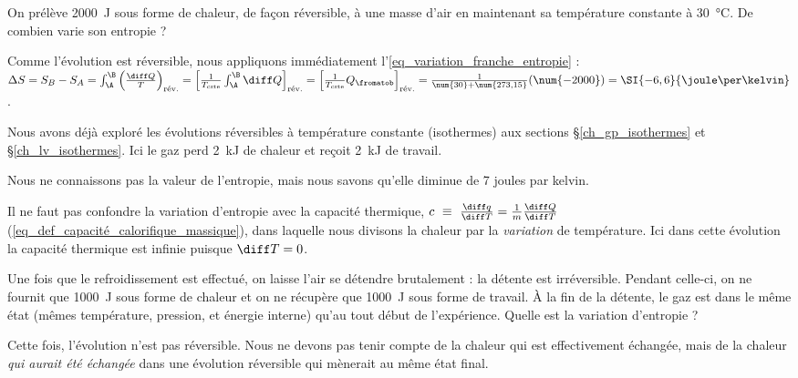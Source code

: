		\begin{anexample}
		\label{exemple_delta_entropie_basics}
			On prélève \SI{2000}{\joule} sous forme de chaleur, de façon réversible, à une masse d’air en maintenant sa température constante à \SI{30}{\degreeCelsius}. De combien varie son entropie ?
				\begin{answer}
					Comme l’évolution est réversible, nous appliquons immédiatement l’\cref{eq_variation_franche_entropie} : $\Delta S 
						= S_B - S_A
						= \int_\A^\B \left( \frac{\diff Q}{T} \right)_\text{rév.} 
						= \left[\frac{1}{T_\text{cste}} \int_\A^\B \diff Q \right]_\text{rév.}
						= \left[\frac{1}{T_\text{cste}} Q_\fromatob \right]_\text{rév.}
						= \frac{1}{\num{30} + \num{273,15}} (\num{-2000})
						= \SI{-6,6}{\joule\per\kelvin}$.
					\begin{remark}Nous avons déjà exploré les évolutions réversibles à température constante (isothermes) aux sections \S\ref{ch_gp_isothermes} et \S\ref{ch_lv_isothermes}. Ici le gaz perd \SI{2}{\kilo\joule} de chaleur et reçoit \SI{2}{\kilo\joule} de travail.\end{remark}
					\begin{remark}Nous ne connaissons pas la valeur de l’entropie, mais nous savons qu’elle diminue de 7 \si{joules} par \si{kelvin}.\end{remark}
					\begin{remark}Il ne faut pas confondre la variation d’entropie avec la capacité thermique, $c\ \equiv \ \frac{\diff q}{\diff T} = \frac{1}{m} \frac{\diff Q}{\diff T}$ (\ref{eq_def_capacité_calorifique_massique}), dans laquelle nous divisons la chaleur par la \emph{variation} de température. Ici dans cette évolution la capacité thermique est infinie puisque  $\diff T = 0$.\end{remark}
				\end{answer}
			
			Une fois que le refroidissement est effectué, on laisse l’air se détendre brutalement : la détente est irréversible. Pendant celle-ci, on ne fournit que \SI{1000}{\joule} sous forme de chaleur et on ne récupère que \SI{1000}{\joule} sous forme de travail. À la fin de la détente, le gaz est dans le même état (mêmes température, pression, et énergie interne) qu’au tout début de l’expérience. Quelle est la variation d’entropie ?
				\begin{answer} Cette fois, l’évolution n’est pas réversible. Nous ne devons pas tenir compte de la chaleur qui est effectivement échangée, mais de la chaleur \emph{qui aurait été échangée} dans une évolution réversible qui mènerait au même état final.
				

\end{answer}
\end{anexample}

